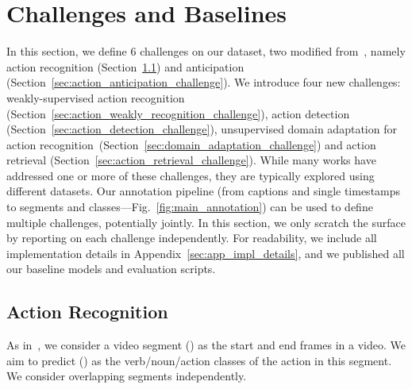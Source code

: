 \documentclass[twocolumn]{svjour3}          \smartqed
\newcommand{\chParagraph}[1]{\noindent {\textbf{#1.}} \hspace{6pt}}
\begin{document}
\section{Challenges and Baselines}
\label{sec:challenges}
In this section, we define 6 challenges on our dataset, two modified from~\cite{Damen2018EPICKITCHENS}, namely action recognition (Section~\ref{sec:action_recognition_challenge}) and anticipation (Section~\ref{sec:action_anticipation_challenge}). We introduce four new challenges: weakly-supervised action recognition (Section~\ref{sec:action_weakly_recognition_challenge}), action detection (Section~\ref{sec:action_detection_challenge}),  unsupervised domain adaptation for action recognition~(Section~\ref{sec:domain_adaptation_challenge}) and action retrieval (Section~\ref{sec:action_retrieval_challenge}). 
While many works have addressed one or more of these challenges, they are typically explored using different datasets. Our annotation pipeline (from captions and single timestamps to segments and classes---Fig.~\ref{fig:main_annotation}) can be used to define multiple challenges, potentially jointly. In this section, we only scratch the surface by reporting on each challenge independently. For readability, we include all implementation details in Appendix~\ref{sec:app_impl_details}, and we published all our baseline models and evaluation scripts.
\subsection{Action Recognition}
\label{sec:action_recognition_challenge}
\chParagraph{Definition} As in~\cite{Damen2018EPICKITCHENS}, we consider a video segment () as the start and end frames in a video. We aim to predict () as the verb/noun/action classes of the action in this segment. We consider overlapping segments independently.
\end{document}
